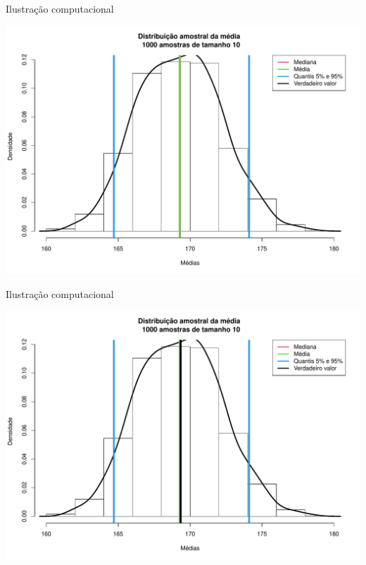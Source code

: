 \documentclass[
  ignorenonframetext,
  serif,
  professionalfont,
  usenames,
  dvipsnames,
  aspectratio = 169]{beamer}
\begin{document}
\begin{frame}{Ilustração computacional}
\protect\hypertarget{ilustrauxe7uxe3o-computacional-5}{}
\begin{center}\includegraphics[width=0.7\linewidth]{600-intro-inferencia_files/figure-beamer/unnamed-chunk-4-1} \end{center}
\end{frame}

\begin{frame}{Ilustração computacional}
\protect\hypertarget{ilustrauxe7uxe3o-computacional-6}{}
\begin{center}\includegraphics[width=0.7\linewidth]{600-intro-inferencia_files/figure-beamer/unnamed-chunk-5-1} \end{center}
\end{frame}
\end{document}
